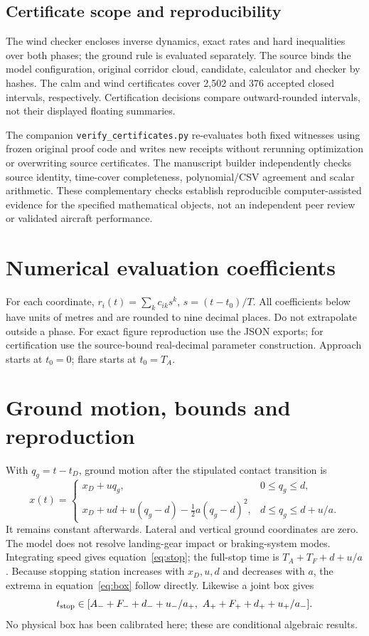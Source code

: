 \subsection*{Certificate scope and reproducibility}
The wind checker encloses inverse dynamics, exact rates and hard inequalities over both phases; the ground rule is evaluated separately. The source binds the model configuration, original corridor cloud, candidate, calculator and checker by hashes. The calm and wind certificates cover 2,502 and 376 accepted closed intervals, respectively. Certification decisions compare outward-rounded intervals, not their displayed floating summaries.

The companion \texttt{verify\_\allowbreak certificates.py} re-evaluates both fixed witnesses using frozen original proof code and writes new receipts without rerunning optimization or overwriting source certificates. The manuscript builder independently checks source identity, time-cover completeness, polynomial/CSV agreement and scalar arithmetic. These complementary checks establish reproducible computer-assisted evidence for the specified mathematical objects, not an independent peer review or validated aircraft performance.
\par\medskip
\section{Numerical evaluation coefficients}\label{app:coefficients}
For each coordinate, $r_i(t)=\sum_k c_{ik}s^k$, $s=(t-t_0)/T$. All coefficients below have units of metres and are rounded to nine decimal places. Do not extrapolate outside a phase. For exact figure reproduction use the JSON exports; for certification use the source-bound real-decimal parameter construction. Approach starts at $t_0=0$; flare starts at $t_0=T_A$.

\section{Ground motion, bounds and reproduction}\label{app:ground}
With $q_g=t-t_D$, ground motion after the stipulated contact transition is
\[
x(t)=\begin{cases}
x_D+uq_g,&0\leq q_g\leq d,\\
x_D+ud+u(q_g-d)-\tfrac12a(q_g-d)^2,&d\leq q_g\leq d+u/a.
\end{cases}
\]
It remains constant afterwards. Lateral and vertical ground coordinates are zero. The model does not resolve landing-gear impact or braking-system modes. Integrating speed gives equation~\eqref{eq:stop}; the full-stop time is $T_A+T_F+d+u/a$. Because stopping station increases with $x_D,u,d$ and decreases with $a$, the extrema in equation~\eqref{eq:box} follow directly. Likewise a joint box gives
\[
t_{\rm stop}\in[A_-+F_-+d_-+u_-/a_+,\ A_++F_++d_++u_+/a_-].
\]
No physical box has been calibrated here; these are conditional algebraic results.

